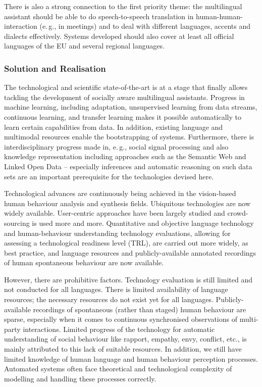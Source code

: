 \documentclass[10pt, plain]{../../metanetpaper}
\begin{document}
\begin{multicols}{2}
There is also a strong connection to the first priority theme: the multilingual assistant should be able to do speech-to-speech translation in human-human-interaction (e.\,g., in meetings) and to deal with different languages, accents and dialects effectively. Systems developed should also cover at least all official languages of the EU and several regional languages.

\subsubsection{Solution and Realisation}
\label{sec:solut-techn-real-pt3}

The technological and scientific state-of-the-art is at a stage that finally allows tackling the development of socially aware multilingual assistants. Progress in machine learning, including adaptation, unsupervised learning from data streams, continuous learning, and transfer learning makes it possible automatically to learn certain capabilities from data. In addition, existing language and multimodal resources enable the bootstrapping of systems. Furthermore, there is interdisciplinary progress made in, e.\,g., social signal processing and also knowledge representation including approaches such as the Semantic Web and Linked Open Data -- especially inferences and automatic reasoning on such data sets are an important prerequisite for the technologies devised here.
 
Technological advances are continuously being achieved in the vision-based human behaviour analysis and synthesis fields. Ubiquitous technologies are now widely available. User-centric approaches have been largely studied and crowd-sourcing is used more and more. Quantitative and objective language technology and human-behaviour understanding technology evaluations, allowing for assessing a technological readiness level (TRL), are carried out more widely, as best practice, and language resources and publicly-available annotated recordings of human spontaneous behaviour are now available.
 
However, there are prohibitive factors. Technology evaluation is still limited and not conducted for all languages. There is limited availability of language resources; the necessary resources do not exist yet for all languages. Publicly-available recordings of spontaneous (rather than staged) human behaviour are sparse, especially when it comes to continuous synchronised observations of multi-party interactions. Limited progress of the technology for automatic understanding of social behaviour like rapport, empathy, envy, conflict, etc., is mainly attributed to this lack of suitable resources. In addition, we still have limited knowledge of human language and human behaviour perception processes. Automated systems often face theoretical and technological complexity of modelling and handling these processes correctly.


\end{multicols}
\end{document}
